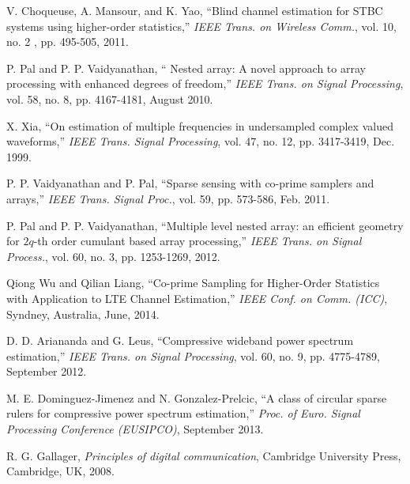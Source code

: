 \documentclass[letterpaper,10pt]{article}
\begin{document}
\begin{thebibliography}{1}
   V. Choqueuse, A. Mansour, and K. Yao, ``Blind channel estimation for STBC systems using higher-order statistics,'' \emph{IEEE Trans. on Wireless Comm.}, vol. 10, no. 2 , pp. 495-505, 2011.

   P. Pal and P. P. Vaidyanathan, `` Nested array: A novel approach to array processing with enhanced degrees of freedom,'' \emph{IEEE Trans. on Signal Processing}, vol. 58, no. 8, pp. 4167-4181, August 2010.

  X. Xia, ``On estimation of multiple frequencies in undersampled complex valued waveforms,'' \emph{IEEE Trans. Signal Processing}, vol. 47, no. 12, pp. 3417-3419, Dec. 1999.

  P. P. Vaidyanathan and P. Pal, ``Sparse sensing with co-prime samplers and arrays,'' \emph{IEEE Trans. Signal Proc.}, vol. 59, pp. 573-586, Feb. 2011.

   P. Pal and P. P. Vaidyanathan, ``Multiple level nested array: an efficient geometry for $2q$-th order cumulant based array processing,'' \emph{IEEE Trans. on Signal Process.}, vol. 60, no. 3, pp. 1253-1269, 2012.

   Qiong Wu and Qilian Liang, ``Co-prime Sampling for Higher-Order Statistics with Application to LTE Channel Estimation,'' \emph{IEEE Conf. on Comm. (ICC)}, Syndney, Australia, June, 2014.

   D. D. Ariananda and G. Leus, ``Compressive wideband power spectrum estimation,'' \emph{IEEE Trans. on Signal Processing}, vol. 60, no. 9, pp. 4775-4789, September 2012.

   M. E. Dominguez-Jimenez and N. Gonzalez-Prelcic, ``A class of circular sparse rulers for compressive power spectrum estimation,'' \emph{Proc. of Euro. Signal Processing Conference (EUSIPCO)}, September 2013.

   R. G. Gallager, \emph{Principles of digital communication}, Cambridge University Press, Cambridge, UK, 2008.


\end{thebibliography}
\end{document}
